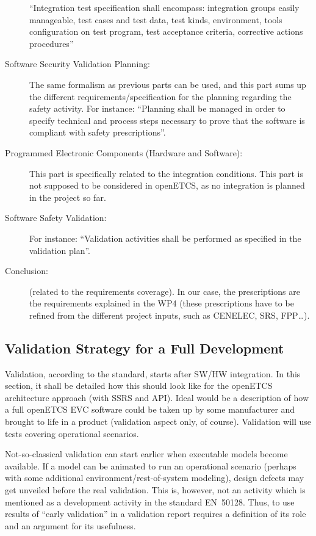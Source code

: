 \documentclass{template/openetcs_report}
\begin{document}
\begin{description}
  ``Integration test specification shall encompass: integration groups
  easily manageable, test cases and test data, test kinds,
  environment, tools configuration on test program, test acceptance
  criteria, corrective actions procedures''
\item[Software Security Validation Planning:] The same formalism as
  previous parts can be used, and this part sums up the different
  requirements/specification for the planning regarding the safety
  activity. For instance: ``Planning shall be managed in order to
  specify technical and process steps necessary to prove that the
  software is compliant with safety prescriptions''.
\item[Programmed Electronic Components (Hardware and Software):] This
  part is specifically related to the integration conditions. This
  part is not supposed to be considered in openETCS, as no
  integration is planned in the project so far.
\item[Software Safety Validation:] For instance: ``Validation
  activities shall be performed as specified in the validation plan''.
\item[Conclusion:] (related to the requirements coverage). In our
  case, the prescriptions are the requirements explained in the WP4
  (these prescriptions have to be refined from the different project
  inputs, such as CENELEC, SRS, FPP…).
\end{description}


\subsection{Validation Strategy for a Full Development}
\label{sec:valid-strategy-full}

Validation, according to the standard, starts after SW/HW
integration. In this section, it shall be detailed how this should
look like for the openETCS architecture approach (with SSRS and
API). Ideal would be a description of how a full openETCS EVC software
could be taken up by some manufacturer and brought to life in a
product (validation aspect only, of course). Validation will use tests
covering operational scenarios.  

Not-so-classical validation can start earlier when executable models
become available. If a model can be animated to run an operational
scenario (perhaps with some additional environment/rest-of-system
modeling), design defects may get unveiled before the real
validation. This is, however, not an activity which is mentioned as a
development activity in the standard EN~50128. Thus, to use results of
``early validation'' in a validation report requires a definition of
its role and an argument for its usefulness.
\end{document}
